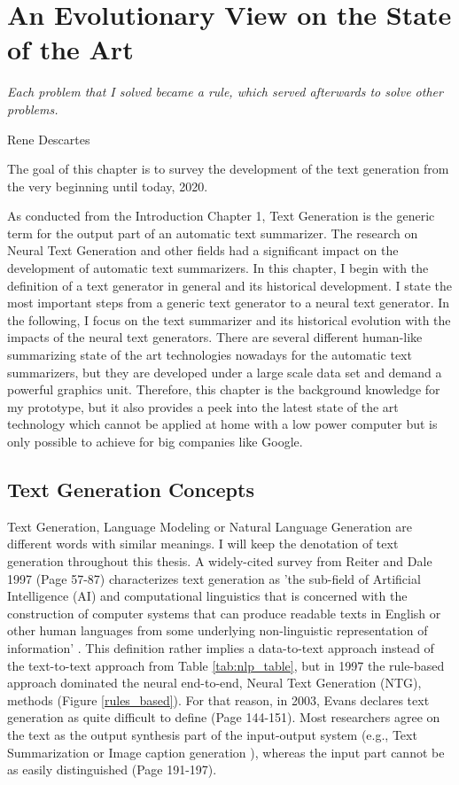 \chapter{An Evolutionary View on the State of the Art}\label{ch:sota}

\epigraph{\textit{Each problem that I solved became a rule, which served afterwards to solve other problems.}}{Rene Descartes}

The goal of this chapter is to survey the development of the text generation from the very beginning until today, 2020. 

As conducted from the Introduction Chapter 1, Text Generation is the generic term for the output part of an automatic text summarizer. The research on Neural Text Generation and other fields had a significant impact on the development of automatic text summarizers. In this chapter, I begin with the definition of a text generator in general and its historical development. I state the most important steps from a generic text generator to a neural text generator. In the following, I focus on the text summarizer and its historical evolution with the impacts of the neural text generators. There are several different human-like summarizing state of the art technologies nowadays for the automatic text summarizers, but they are developed under a large scale data set and demand a powerful graphics unit. Therefore, this chapter is the background knowledge for my prototype, but it also provides a peek into the latest state of the art technology which cannot be applied at home with a low power computer but is only possible to achieve for big companies like Google.

\section{Text Generation Concepts}\label{ss:history}

Text Generation, Language Modeling or Natural Language Generation are different words with similar meanings. I will keep the denotation of text generation throughout this thesis. A widely-cited survey from Reiter and Dale 1997 (Page 57-87) \cite{reiter} characterizes text generation as 'the sub-field of Artificial Intelligence (AI) and computational linguistics that is concerned with the construction of computer systems that can produce readable texts in English or other human languages from some underlying non-linguistic representation of information' \cite{reiter}. This definition rather implies a data-to-text approach instead of the text-to-text approach from Table \ref{tab:nlp_table}, but in 1997 the rule-based approach dominated the neural end-to-end, Neural Text Generation (NTG), methods (Figure \ref{rules_based}). For that reason, in 2003, Evans declares text generation as quite difficult to define \cite{evans} (Page 144-151). Most researchers agree on the text as the output synthesis part of the input-output system (e.g., Text Summarization or Image caption generation \cite{mitchell}), whereas the input part cannot be as easily distinguished \cite{mcdonald} (Page 191-197).


